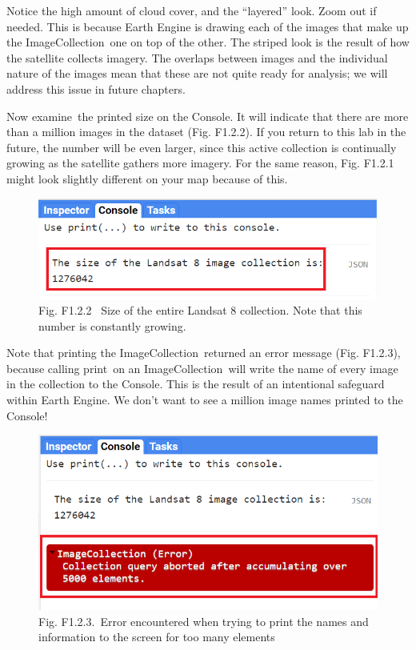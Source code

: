 \documentclass[
  letterpaper,
  DIV=11,
  numbers=noendperiod]{scrreprt}
\begin{document}
Notice the high amount of cloud cover, and the ``layered'' look. Zoom
out if needed. This is because Earth Engine is drawing each of the
images that make up the ImageCollection~one on top of the other. The
striped look is the result of how the satellite collects imagery. The
overlaps between images and the individual nature of the images mean
that these are not quite ready for analysis; we will address this issue
in future chapters.

Now examine~the printed size on the Console. It will indicate that there
are more than a million images in the dataset (Fig. F1.2.2). If you
return to this lab in the future, the number will be even larger, since
this active collection is continually growing as the satellite gathers
more imagery. For the same reason, Fig. F1.2.1 might look slightly
different on your map because of this.

\begin{figure}

{\centering \includegraphics{./F1/image9.png}

}

\caption{Fig. F1.2.2 ~Size of the entire Landsat 8 collection. Note that
this number is constantly growing.}

\end{figure}

Note that printing the ImageCollection~returned an error message (Fig.
F1.2.3), because calling print~on an ImageCollection~will write the name
of every image in the collection to the Console. This is the result of
an intentional safeguard within Earth Engine. We don't want to see a
million image names printed to the Console!

\begin{figure}

{\centering \includegraphics{./F1/image71.png}

}

\caption{Fig. F1.2.3.~Error encountered when trying to print the names
and information to the screen for too many elements}

\end{figure}
\end{document}
